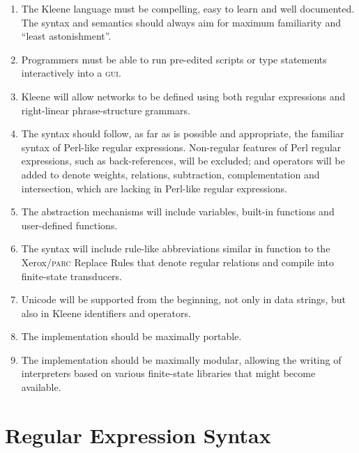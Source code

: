 \documentclass[letterpaper,12pt]{article}
\newcommand{\Kleene}{Kleene\xspace}
\newcommand{\acro}{\textsc}
\begin{document}
\begin{enumerate}

\item
The \Kleene{} language must be compelling, easy to learn and well documented.  
The syntax and semantics should always aim for maximum
familiarity and ``least astonishment''.

\item
Programmers must be able to run pre-edited scripts or
type statements interactively into a \acro{gui}.

\item
\Kleene{} will allow networks to be defined using 
both regular expressions and right-linear
phrase-structure grammars. 

\item
The syntax should follow, as far as is
possible and appropriate, the familiar syntax of Perl-like regular
expressions.  Non-regular features of Perl regular expressions, 
such as back-references, will be
excluded; and operators will be added to denote weights,
relations, subtraction, complementation and intersection, which are
lacking in Perl-like regular expressions.

\item
The abstraction mechanisms will include variables, built-in functions
and user-defined functions.


\item
The syntax will include rule-like abbreviations similar in function to the
Xerox/\acro{parc} Replace Rules
\cite{karttunen:1995,karttunen+kempe:1995,karttunen:1996,kempe+karttunen:1996,mohri+sproat:1996} that denote regular relations and
compile into finite-state transducers.  

\item
Unicode will be supported from the beginning, not only in data
strings, but also in \Kleene{} identifiers and operators.

\item
The implementation should be maximally portable.

\item
The implementation should be maximally modular, allowing the writing of
interpreters based on various finite-state libraries that might become
available.

\end{enumerate}

\section{Regular Expression Syntax}
\end{document}

